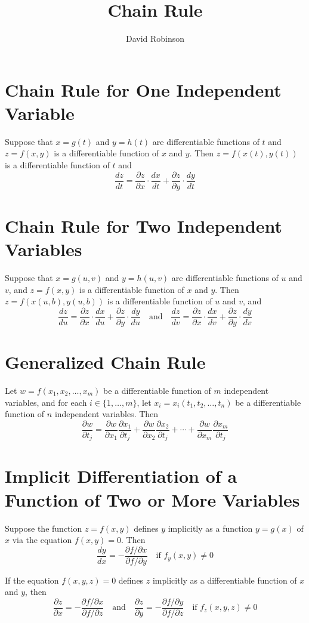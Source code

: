 \documentclass{article}
\title{Chain Rule}
\author{David Robinson}
\date{}
\begin{document}
\maketitle

\section*{Chain Rule for One Independent Variable}

Suppose that $x=g(t)$ and $y=h(t)$ are differentiable functions of $t$ and $z=f(x,y)$ is a differentiable function of $x$ and $y$. Then $z=f(x(t),y(t))$ is a differentiable function of $t$ and
\[\frac{dz}{dt}=\frac{\partial z}{\partial x}\cdot\frac{dx}{dt}+\frac{\partial z}{\partial y}\cdot\frac{dy}{dt}\]

\section*{Chain Rule for Two Independent Variables}

Suppose that $x=g(u,v)$ and $y=h(u,v)$ are differentiable functions of $u$ and $v$, and $z=f(x,y)$ is a differentiable function of $x$ and $y$. Then $z=f(x(u,b),y(u,b))$ is a differentiable function of $u$ and $v$, and
\[\frac{dz}{du}=\frac{\partial z}{\partial x}\cdot\frac{dx}{du}+\frac{\partial z}{\partial y}\cdot\frac{dy}{du}\quad\text{and}\quad\frac{dz}{dv}=\frac{\partial z}{\partial x}\cdot\frac{dx}{dv}+\frac{\partial z}{\partial y}\cdot\frac{dy}{dv}\]

\section*{Generalized Chain Rule}

Let $w=f(x_1,x_2,\ldots,x_m)$ be a differentiable function of $m$ independent variables, and for each $i\in\{1,\ldots, m\}$, let $x_i=x_i(t_1, t_2,\ldots,t_n)$ be a differentiable function of $n$ independent variables. Then
\[\frac{\partial w}{\partial t_j}=\frac{\partial w}{\partial x_1}\frac{\partial x_1}{\partial t_j}+\frac{\partial w}{\partial x_2}\frac{\partial x_2}{\partial t_j}+\cdots+\frac{\partial w}{\partial x_m}\frac{\partial x_m}{\partial t_j}\]

\section*{Implicit Differentiation of a Function of Two or More Variables}

Suppose the function $z=f(x,y)$ defines $y$ implicitly as a function $y=g(x)$ of $x$ via the equation $f(x,y)=0$. Then
\[\frac{dy}{dx}=-\frac{\partial f / \partial x}{\partial f / \partial y}\quad\text{if $f_y(x,y)\neq 0$}\]

If the equation $f(x,y,z)=0$ defines $z$ implicitly as a differentiable function of $x$ and $y$, then
\[\frac{\partial z}{\partial x}=-\frac{\partial f / \partial x}{\partial f / \partial z}\quad\text{and}\quad\frac{\partial z}{\partial y}=-\frac{\partial f / \partial y}{\partial f / \partial z}\quad\text{if $f_z(x,y,z)\neq 0$}\]
\end{document}
